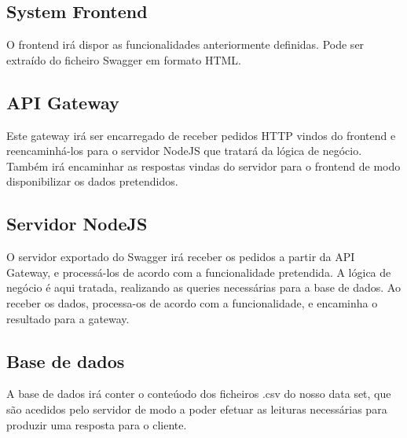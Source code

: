\documentclass[runningheads]{llncs}
\begin{document}
\subsection{System Frontend}
O frontend irá dispor as funcionalidades anteriormente definidas. Pode ser extraído do ficheiro Swagger em formato HTML.

\subsection{API Gateway}
Este gateway irá ser encarregado de receber pedidos HTTP vindos do frontend e reencaminhá-los para o servidor NodeJS que tratará da lógica de negócio. Também irá encaminhar as respostas vindas do servidor para o frontend de modo disponibilizar os dados pretendidos.

\subsection{Servidor NodeJS}
O servidor exportado do Swagger irá receber os pedidos a partir da API Gateway, e processá-los de acordo com a funcionalidade pretendida. A lógica de negócio é aqui tratada, realizando as queries necessárias para a base de dados. Ao receber os dados, processa-os de acordo com a funcionalidade, e encaminha o resultado para a gateway.

\subsection{Base de dados}
A base de dados irá conter o conteúodo dos ficheiros .csv do nosso data set, que são acedidos pelo servidor de modo a poder efetuar as leituras necessárias para produzir uma resposta para o cliente. 
\end{document}

